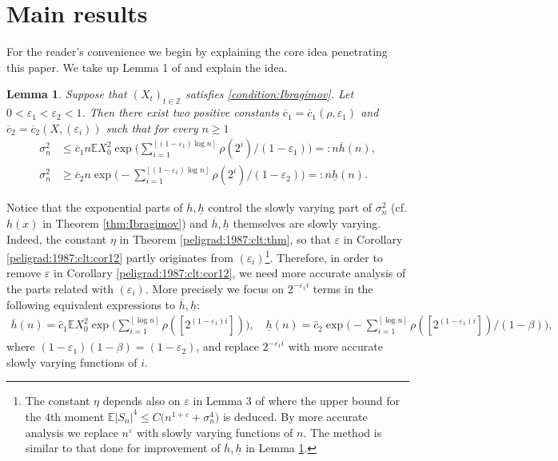 \documentclass[11pt,a4,leqno]{amsart}
\newtheorem{lemma}{Lemma}[section]
\newcommand{\ov}{\overline}
\newcommand{\ud}{\underline}
\newcommand{\wh}{\widehat}
\newcommand{\vep}{\varepsilon}
\newcommand{\Z}{{\mathbb Z}}
\newcommand{\E }{{\mathbb E}}
\newcommand{\1}{{\mathbf 1}}
\begin{document}
\section{Main results}  
\label{sec:main:results}
For the reader's convenience we begin by explaining the core idea penetrating this paper. 
We take up Lemma 1 of \cite{peligrad:1987} and explain the idea.
\begin{lemma}
\label{lem:1:peligrad:1987}
 Suppose that $(X_t)_{t\in \Z}$ satisfies \eqref{condition:Ibragimov}. Let $0<\vep_1 < \vep_2<1$. Then there exist two positive 
constants $\ov c_1= \ov c_1 (\rho,\vep_1)$ and $\ov c_2=\ov c_2(X,(\vep_i))$ such that for every $n\ge 1$
\begin{align}
 \sigma_n^2 & \le \ov c_1 n \E X_0^2 \exp\bigg(
\sum_{i=1}^{[(1-\vep_1) \log n]} \rho(2^i)/(1-\vep_1)
\bigg) =: n \ov h (n), \\
 \sigma_n^2 & \ge \ov c_2 n \exp \bigg(
-\sum_{i=1}^{[(1-\vep_1) \log n]} \rho(2^i)/(1-\vep_2)
\bigg) =: n\ud h(n). 
\end{align}
\end{lemma} 
Notice that the exponential parts of $\ov h,\ud h$ control the slowly varying part of $\sigma_n^2$ (cf. $h(x)$ in Theorem \ref{thm:Ibragimov}) and 
$\ov h,\ud h$ themselves are slowly varying. Indeed, the constant $\eta$ in Theorem \ref{peligrad:1987:clt:thm}, 
so that $\vep$ in Corollary \ref{peligrad:1987:clt:cor12} partly originates from $(\vep_i)$\footnote{
The constant $\eta$ depends also on $\vep$ in Lemma 3 of \cite{peligrad:1987} where 
the upper bound for the $4$th moment $\E|S_n|^4 \le C\big(n^{1+\vep}+\sigma_n^4\big)$ is deduced. 
By more accurate analysis we replace $n^{\vep}$ with slowly varying functions of 
$n$. The method is similar to that done for improvement of $\ov h,\ud h$ in Lemma \ref{lem:1:peligrad:1987}.  
}.
Therefore, in order to remove $\vep$ in Corollary \ref{peligrad:1987:clt:cor12}, we need more accurate analysis 
of the parts related with $(\vep_i)$. More precisely we focus on $2^{-\vep_1 i}$ terms in 
the following equivalent expressions to $\ov h,\ud h$: 
\begin{align}
\label{exp:ovh:udh:respective}
 \ov h(n)  = \wh c_1 \E X_0^2 \exp\bigg(
\sum_{i=1}^{[\log n]} \rho([2^{(1-\vep_1)i}]) 
\bigg), \quad 
 \ud h(n)  = \wh c_2 \exp \bigg(
-\sum_{i=1}^{[\log n]} \rho([2^{(1-\vep_1)i}])/(1-\beta)
\bigg), 
\end{align}
where $(1-\vep_1)(1-\beta)=(1-\vep_2)$, and replace $2^{-\vep_1 i}$ with more accurate 
slowly varying functions of $i$. 
\end{document}
